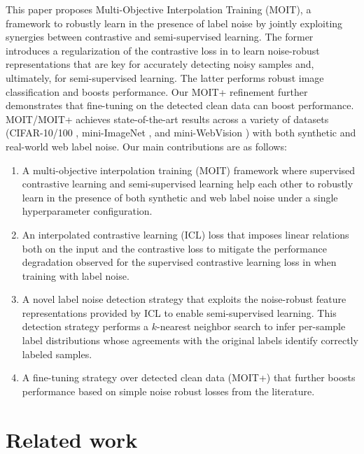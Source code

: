 \documentclass[final]{cvpr}
\begin{document}
This paper proposes Multi-Objective Interpolation Training (MOIT), a framework to robustly learn in the presence of label noise by jointly exploiting synergies between contrastive and semi-supervised learning. The former introduces a regularization of the contrastive loss in \cite{2020_arXiv_SupContLearn} to learn noise-robust representations that are key for accurately detecting noisy samples and, ultimately, for semi-supervised learning. The latter performs robust image classification and boosts performance.
Our MOIT+ refinement further demonstrates that fine-tuning on the detected clean data can boost performance. MOIT/MOIT+ achieves state-of-the-art results across a variety of datasets (CIFAR-10/100 \cite{2009_CIFAR}, mini-ImageNet \cite{2020_ICML_DatasetOOD}, and mini-WebVision \cite{2017_arXiv_WebVision}) with both synthetic and real-world web label noise. Our main contributions are as follows:
\begin{enumerate}
\item A multi-objective interpolation training (MOIT) framework where supervised contrastive learning and semi-supervised learning help each other to robustly learn in the presence of both synthetic and web label noise under a single hyperparameter configuration.
\item An interpolated contrastive learning (ICL) loss that imposes linear relations both on the input and the contrastive loss to mitigate the performance degradation observed for the supervised contrastive learning loss in \cite{2020_arXiv_SupContLearn} when training with label noise.

\item A novel label noise detection strategy that exploits the noise-robust feature representations provided by ICL to enable semi-supervised learning. This detection strategy performs a $k$-nearest neighbor search to infer per-sample label distributions whose agreements with the original labels identify correctly labeled samples.


\item A fine-tuning strategy over detected clean data (MOIT+) that further boosts performance based on simple noise robust losses from the literature.

\end{enumerate}

\section{Related work}
\end{document}
